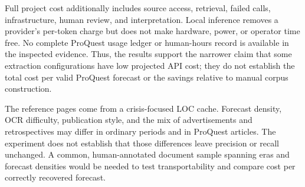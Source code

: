 Full project cost additionally includes source access, retrieval, failed calls, infrastructure, human review, and interpretation. Local inference removes a provider's per-token charge but does not make hardware, power, or operator time free. No complete ProQuest usage ledger or human-hours record is available in the inspected evidence. Thus, the results support the narrower claim that some extraction configurations have low projected API cost; they do not establish the total cost per valid ProQuest forecast or the savings relative to manual corpus construction.

The reference pages come from a crisis-focused LOC cache. Forecast density, OCR difficulty, publication style, and the mix of advertisements and retrospectives may differ in ordinary periods and in ProQuest articles. The experiment does not establish that those differences leave precision or recall unchanged. A common, human-annotated document sample spanning eras and forecast densities would be needed to test transportability and compare cost per correctly recovered forecast.

